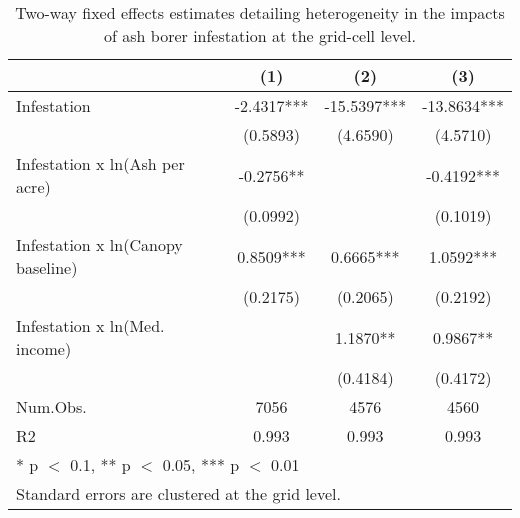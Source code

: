 \begin{table}[!h]

\caption{Two-way fixed effects estimates detailing heterogeneity in the impacts of ash borer infestation at the grid-cell level.}
\centering
\begin{tabular}[t]{lccc}
\toprule
  & (1) & (2) & (3)\\
\midrule
Infestation & -2.4317*** & -15.5397*** & -13.8634***\\
 & (0.5893) & (4.6590) & (4.5710)\\
Infestation x ln(Ash per acre) & -0.2756** &  & -0.4192***\\
 & (0.0992) &  & (0.1019)\\
Infestation x ln(Canopy baseline) & 0.8509*** & 0.6665*** & 1.0592***\\
 & (0.2175) & (0.2065) & (0.2192)\\
Infestation x ln(Med. income) &  & 1.1870** & 0.9867**\\
 &  & (0.4184) & (0.4172)\\
\midrule
Num.Obs. & 7056 & 4576 & 4560\\
R2 & 0.993 & 0.993 & 0.993\\
\bottomrule
\multicolumn{4}{l}{\rule{0pt}{1em}* p $<$ 0.1, ** p $<$ 0.05, *** p $<$ 0.01}\\
\multicolumn{4}{l}{\rule{0pt}{1em}Standard errors are clustered at the grid level.}\\
\end{tabular}
\end{table}
